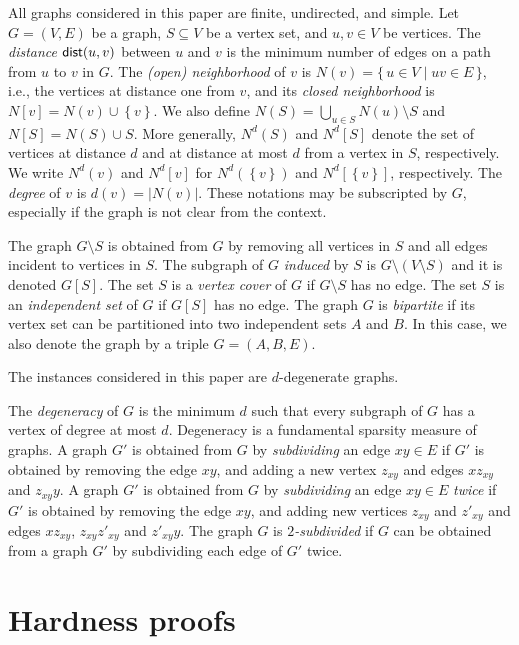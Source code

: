 \documentclass[10pt,usletter]{article}
\newcommand{\SB}{\{\,}\newcommand{\SM}{\;{|}\;}\newcommand{\SE}{\,\}}
\newcommand{\set}[1]{\left\{ #1 \right\}}
\newcommand{\dist}{{\normalfont \textsf{dist}}}
\begin{document}
All graphs considered in this paper are finite, undirected, and simple.
Let $G=(V,E)$ be a graph, $S\subseteq V$ be a vertex set, and $u,v\in V$ be vertices.
The \emph{distance} $\dist(u,v)$ between $u$ and $v$ is the minimum number of
edges on a path from $u$ to $v$ in $G$.
The \emph{(open) neighborhood} of $v$ is $N(v)= \SB u\in V \SM  uv\in E \SE$,
i.e., the vertices at distance one from $v$,
and its \emph{closed neighborhood} is $N[v]=N(v)\cup \set{v}$.
We also define $N(S) = \bigcup_{u\in S} N(u) \setminus S$ and
$N[S] = N(S) \cup S$.
More generally, $N^d(S)$ and $N^d[S]$ denote the set of vertices
at distance $d$ and at distance at most $d$ from a vertex in $S$,
respectively. We write $N^d(v)$ and $N^d[v]$ for $N^d(\set{v})$ and $N^d[\set{v}]$, respectively.
The \emph{degree} of $v$ is $d(v)=|N(v)|$.
These notations may be subscripted by $G$, especially if the graph is not clear from the context.

The graph $G\setminus S$ is obtained from $G$ by removing all vertices
in $S$ and all edges incident to vertices in $S$.
The subgraph of $G$ \emph{induced} by $S$ is $G\setminus (V\setminus S)$ and it is
denoted $G[S]$.
The set $S$ is a \emph{vertex cover} of $G$ if $G\setminus S$ has no edge.
The set $S$ is an \emph{independent set} of $G$ if $G[S]$ has no edge.
The graph $G$ is \emph{bipartite} if its vertex set can be partitioned into two
independent sets $A$ and $B$. In this case, we also denote the graph by
a triple $G=(A,B,E)$.

The instances considered in this paper are $d$-degenerate graphs.

The \emph{degeneracy} of $G$ is the minimum $d$ such that every subgraph of $G$ has a vertex of degree
at most $d$.
Degeneracy is a fundamental sparsity measure of graphs.
A graph $G'$ is obtained from $G$ by \emph{subdividing} an edge $xy\in E$ if $G'$ is obtained
by removing the edge $xy$, and adding a new vertex $z_{xy}$ and edges $x z_{xy}$ and
$z_{xy} y$.
A graph $G'$ is obtained from $G$ by \emph{subdividing} an edge $xy\in E$ \emph{twice} if $G'$ is obtained
by removing the edge $xy$, and adding new vertices $z_{xy}$ and $z'_{xy}$ and edges $x z_{xy}$, $z_{xy} z'_{xy}$ and
$z'_{xy} y$.
The graph $G$ is \emph{$2$-subdivided} if $G$ can be obtained from a graph $G'$ by subdividing
each edge of $G'$ twice.







\section{Hardness proofs}
\end{document}
